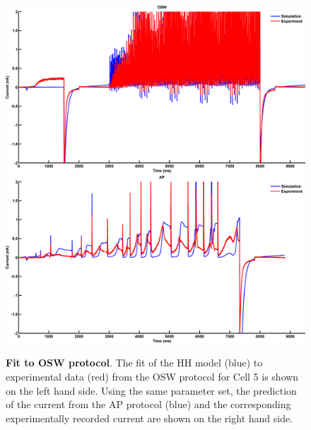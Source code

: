 \documentclass[11pt,a4paper,oneside]{article}
\begin{document}
\begin{figure}[hb]
\begin{center}
\includegraphics[scale=0.42]{Figures/Fig_hh_16713110_FP_original_sine_CP_original_sine.png} 
\includegraphics[scale=0.42]{Figures/Fig_hh_16713110_FP_original_sine_CP_ap.png}
\caption{\textbf{Fit to OSW protocol}. The fit of the HH model (blue) to experimental data (red) from the OSW protocol  for Cell 5 is shown on the left hand side. Using the same parameter set, the prediction of the current from the AP protocol (blue) and the corresponding experimentally recorded current are shown on the right hand side.} 
\label{Fig_OSWfit}
\end{center}
\end{figure}
\end{document}
